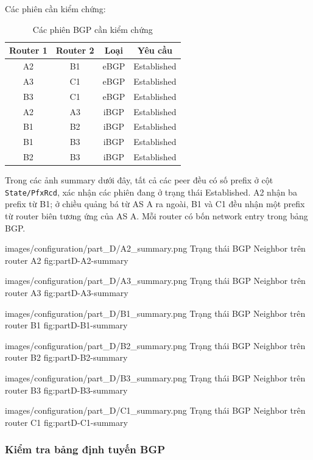 Các phiên cần kiểm chứng:

\begin{table}[H]
\centering
\caption{Các phiên BGP cần kiểm chứng}
\label{tab:partD-sessions}
\small
\begin{tabular}{cccc}
\toprule
\textbf{Router 1} &
\textbf{Router 2} &
\textbf{Loại} &
\textbf{Yêu cầu} \\
\midrule
A2 & B1 & eBGP & Established \\
A3 & C1 & eBGP & Established \\
B3 & C1 & eBGP & Established \\
A2 & A3 & iBGP & Established \\
B1 & B2 & iBGP & Established \\
B1 & B3 & iBGP & Established \\
B2 & B3 & iBGP & Established \\
\bottomrule
\end{tabular}
\end{table}

Trong các ảnh summary dưới đây,
tất cả các peer đều có số prefix
ở cột \texttt{State/PfxRcd}, xác nhận các phiên
đang ở trạng thái Established.
A2 nhận ba prefix từ B1; ở chiều quảng bá
từ AS A ra ngoài, B1 và C1 đều nhận một prefix
từ router biên tương ứng của AS A.
Mỗi router có bốn network entry trong bảng BGP.

\partzeroimage
{images/configuration/part_D/A2_summary.png}
{Trạng thái BGP Neighbor trên router A2}
{fig:partD-A2-summary}

\partzeroimage
{images/configuration/part_D/A3_summary.png}
{Trạng thái BGP Neighbor trên router A3}
{fig:partD-A3-summary}

\partzeroimage
{images/configuration/part_D/B1_summary.png}
{Trạng thái BGP Neighbor trên router B1}
{fig:partD-B1-summary}

\partzeroimage
{images/configuration/part_D/B2_summary.png}
{Trạng thái BGP Neighbor trên router B2}
{fig:partD-B2-summary}

\partzeroimage
{images/configuration/part_D/B3_summary.png}
{Trạng thái BGP Neighbor trên router B3}
{fig:partD-B3-summary}

\partzeroimage
{images/configuration/part_D/C1_summary.png}
{Trạng thái BGP Neighbor trên router C1}
{fig:partD-C1-summary}



\subsubsection{Kiểm tra bảng định tuyến BGP}


